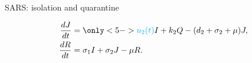 \begin{frame}{SARS: isolation and quarantine}
{\begin{textblock*}{65mm}
\begin{equation*}
\begin{aligned}
            \dfrac{dJ}{dt} &=
                \only<5->{
                    \textcolor{cyan}{u_2(t)}
                }
                  I 
                + k_2 Q
                - (d_2 + \sigma_2 + \mu) J,
            \\
            \dfrac{dR}{dt} &=
                \sigma_1 I
                +\sigma_2 J
                - \mu R.
        \end{aligned}
     \end{equation*}
    \end{textblock*}
    }
    
\end{frame}